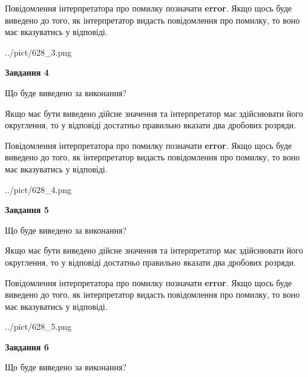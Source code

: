 \documentclass[12pt, ukrainian]{article}
\begin{document}
{\begin {Large}
Повідомлення інтерпретатора про помилку позначати \textbf{error}.
Якщо щось буде виведено до того, як інтерпретатор видасть повідомлення про помилку, 
то воно має вказуватись у відповіді. \par

\begin{center}
	{../pict/628_3.png}
\end{center}
\newpage

{\begin {center}\textbf{Завдання 4}\end {center}}\par
Що буде виведено за виконання? \par

Якщо має бути виведено дійсне значення та інтерпретатор має здійснювати його округлення, 
то у відповіді достатньо правильно вказати два дробових розряди.

Повідомлення інтерпретатора про помилку позначати \textbf{error}.
Якщо щось буде виведено до того, як інтерпретатор видасть повідомлення про помилку, 
то воно має вказуватись у відповіді. \par

\begin{center}
	{../pict/628_4.png}
\end{center}
\newpage

{\begin {center}\textbf{Завдання 5}\end {center}}\par
Що буде виведено за виконання? \par

Якщо має бути виведено дійсне значення та інтерпретатор має здійснювати його округлення, 
то у відповіді достатньо правильно вказати два дробових розряди.

Повідомлення інтерпретатора про помилку позначати \textbf{error}.
Якщо щось буде виведено до того, як інтерпретатор видасть повідомлення про помилку, 
то воно має вказуватись у відповіді. \par

\begin{center}
	{../pict/628_5.png}
\end{center}
\newpage

{\begin {center}\textbf{Завдання 6}\end {center}}\par
Що буде виведено за виконання? \par


\end{Large}}
\end{document}
